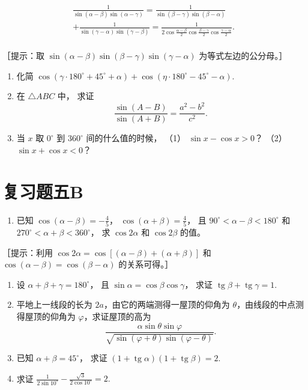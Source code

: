 \[
\begin{array}{l} \frac {1}{\sin (\alpha - \beta) \sin (\alpha - \gamma)} = \frac {1}{\sin (\beta - \gamma) \sin (\beta - \alpha)} \\ + \frac {1}{\sin (\gamma - \alpha) \sin (\gamma - \beta)} = \frac {1}{2 \cos \frac {\alpha - \beta}{2} \cos \frac {\beta - \gamma}{2} \cos \frac {\gamma - \alpha}{2}}. \\ \end{array}
\]

［提示：取 \(\sin(\alpha-\beta)\sin(\beta-\gamma)\sin(\gamma-\alpha)\)
为等式左边的公分母。］

\begin{enumerate}[start=10]
\item
  化简
  \(\cos (\gamma \cdot 180^{\circ} + 45^{\circ} + \alpha) + \cos (\eta \cdot 180^{\circ} - 45^{\circ} - \alpha)\).
\item
  在 \(\triangle ABC\) 中， 求证
\[
\frac {\sin (A - B)}{\sin (A + B)} = \frac {a ^ {2} - b ^ {2}}{c ^ {2}}.
\]
\item
  当 \(x\) 取 \(0^{\circ}\) 到 \(360^{\circ}\) 间的什么值的时候， （1）
  \(\sin x - \cos x > 0\)？ （2） \(\sin x + \cos x < 0\)？
\end{enumerate}

\section{复习题五B}

\begin{enumerate}
\item
  已知 \(\cos (\alpha - \beta) = -\frac{4}{5}\)，
  \(\cos (\alpha + \beta) = \frac{4}{5}\)， 且
  \(90^{\circ} < \alpha - \beta < 180^{\circ}\) 和
  \(270^{\circ} < \alpha + \beta < 360^{\circ}\)， 求 \(\cos 2\alpha\)
  和 \(\cos 2\beta\) 的值。
\end{enumerate}

［提示：利用
\(\cos 2\alpha = \cos[(\alpha - \beta) + (\alpha + \beta)]\) 和
\(\cos (\alpha - \beta) = \cos (\beta - \alpha)\) 的关系可得。］

\begin{enumerate}[start=2]
\item
  设 \(\alpha + \beta + \gamma = 180^{\circ}\)， 且
  \(\sin \alpha = \cos \beta \cos \gamma\)， 求证
  \(\operatorname{tg} \beta + \operatorname{tg} \gamma = 1\).
\item
  平地上一线段的长为 \(2a\)，由它的两端测得一屋顶的仰角为
  \(\theta\)，由线段的中点测得屋顶的仰角为 \(\varphi\)，求证屋顶的高为
\[
\frac {\alpha \sin \theta \sin \varphi}{\sqrt {\sin (\varphi + \theta) \sin (\varphi - \theta)}}.
\]
\item
  已知 \(\alpha + \beta = 45^{\circ}\)， 求证
  \((1 + \operatorname{tg} \alpha)(1 + \operatorname{tg} \beta) = 2\).
\item
  求证
  \(\frac{1}{2\sin 10^{\circ}} - \frac{\sqrt{3}}{2\cos 10^{\circ}} = 2.\)
\end{enumerate}


